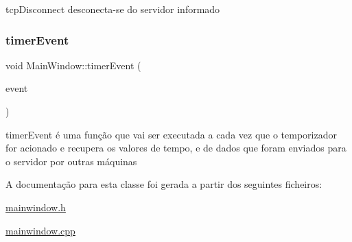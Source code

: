 tcp\+Disconnect desconecta-\/se do servidor informado 

\mbox{\label{class_main_window_aaa425b1554af3c1f58cc70b4815082ae}} 
\subsubsection{\texorpdfstring{timer\+Event}{timerEvent}}
{\footnotesize\ttfamily void Main\+Window\+::timer\+Event (\begin{DoxyParamCaption}\item[{Q\+Timer\+Event $\ast$}]{event }\end{DoxyParamCaption})\hspace{0.3cm}{\ttfamily [slot]}}



timer\+Event é uma função que vai ser executada a cada vez que o temporizador for acionado e recupera os valores de tempo, e de dados que foram enviados para o servidor por outras máquinas 



A documentação para esta classe foi gerada a partir dos seguintes ficheiros\+:\begin{DoxyCompactItemize}
\item 
\hyperlink{mainwindow_8h}{mainwindow.\+h}\item 
\hyperlink{mainwindow_8cpp}{mainwindow.\+cpp}\end{DoxyCompactItemize}

